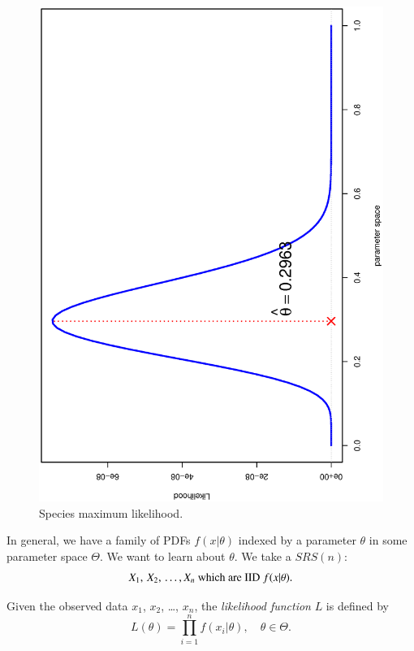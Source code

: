\documentclass[captions=tableheading]{scrbook}
\begin{document}
\begin{figure}[th]
    \includegraphics[angle=270, totalheight=4in]{img/species-mle.ps}
    \caption[Species maximum likelihood]{\small Species maximum likelihood.}
    \label{fig:species-mle}
  \end{figure}

In general, we have a family of PDFs \(f(x|\theta)\) indexed by a parameter \(\theta\) in some parameter space \(\Theta\). We want to learn about \(\theta\). We take a \(SRS(n)\):
\begin{equation}
X_{1},\, X_{2},\,\ldots,X_{n}\mbox{ which are IID \( f(x| \theta ) \).}
\end{equation}

\begin{defn}
Given the observed data \(x_{1}\), \(x_{2}\), \ldots{}, \(x_{n}\), the \emph{likelihood function} \(L\) is defined by 
\[ 
L(\theta)=\prod_{i=1}^{n}f(x_{i}|\theta),\quad\theta\in\Theta.
\]
\end{defn}
\end{document}
